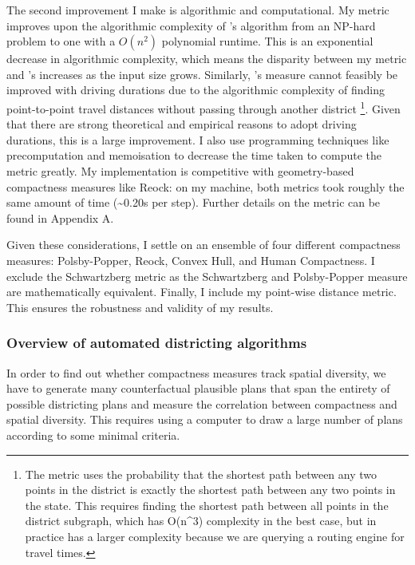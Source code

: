 \documentclass[]{article}
\begin{document}
The second improvement I make is algorithmic and computational. My
metric improves upon the algorithmic complexity of \citeauthor{fh2011}'s
algorithm from an NP-hard problem to one with a \(O(n^2)\) polynomial
runtime. This is an exponential decrease in algorithmic complexity,
which means the disparity between my metric and \citeauthor{fh2011}'s
increases as the input size grows. Similarly, \citeauthor{cm2010}'s
measure cannot feasibly be improved with driving durations due to the
algorithmic complexity of finding point-to-point travel distances
without passing through another district \footnote{The metric uses the
  probability that the shortest path between any two points in the
  district is exactly the shortest path between any two points in the
  state. This requires finding the shortest path between all points in
  the district subgraph, which has O(n\^{}3) complexity in the best
  case, but in practice has a larger complexity because we are querying
  a routing engine for travel times.}. Given that there are strong
theoretical and empirical reasons to adopt driving durations, this is a
large improvement. I also use programming techniques like precomputation
and memoisation to decrease the time taken to compute the metric
greatly. My implementation is competitive with geometry-based
compactness measures like Reock: on my machine, both metrics took
roughly the same amount of time (\textasciitilde{}0.20s per step).
Further details on the metric can be found in Appendix A.

Given these considerations, I settle on an ensemble of four different
compactness measures: Polsby-Popper, Reock, Convex Hull, and Human
Compactness. I exclude the Schwartzberg metric as the Schwartzberg and
Polsby-Popper measure are mathematically equivalent. Finally, I include
my point-wise distance metric. This ensures the robustness and validity
of my results.

\hypertarget{overview-of-automated-districting-algorithms}{%
\subsubsection{Overview of automated districting
algorithms}\label{overview-of-automated-districting-algorithms}}

In order to find out whether compactness measures track spatial
diversity, we have to generate many counterfactual plausible plans that
span the entirety of possible districting plans and measure the
correlation between compactness and spatial diversity. This requires
using a computer to draw a large number of plans according to some
minimal criteria.
\end{document}
